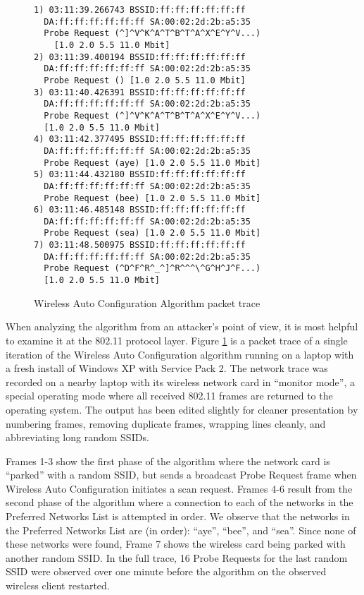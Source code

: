 \documentclass[10pt,twocolumn]{article}
\begin{document}

\begin{figure}
\begin{verbatim}
1) 03:11:39.266743 BSSID:ff:ff:ff:ff:ff:ff
  DA:ff:ff:ff:ff:ff:ff SA:00:02:2d:2b:a5:35
  Probe Request (^]^V^K^A^T^B^T^A^X^E^Y^V...)
    [1.0 2.0 5.5 11.0 Mbit]
2) 03:11:39.400194 BSSID:ff:ff:ff:ff:ff:ff
  DA:ff:ff:ff:ff:ff:ff SA:00:02:2d:2b:a5:35
  Probe Request () [1.0 2.0 5.5 11.0 Mbit]
3) 03:11:40.426391 BSSID:ff:ff:ff:ff:ff:ff
  DA:ff:ff:ff:ff:ff:ff SA:00:02:2d:2b:a5:35
  Probe Request (^]^V^K^A^T^B^T^A^X^E^Y^V...)
  [1.0 2.0 5.5 11.0 Mbit]
4) 03:11:42.377495 BSSID:ff:ff:ff:ff:ff:ff
  DA:ff:ff:ff:ff:ff:ff SA:00:02:2d:2b:a5:35
  Probe Request (aye) [1.0 2.0 5.5 11.0 Mbit]
5) 03:11:44.432180 BSSID:ff:ff:ff:ff:ff:ff
  DA:ff:ff:ff:ff:ff:ff SA:00:02:2d:2b:a5:35
  Probe Request (bee) [1.0 2.0 5.5 11.0 Mbit]
6) 03:11:46.485148 BSSID:ff:ff:ff:ff:ff:ff
  DA:ff:ff:ff:ff:ff:ff SA:00:02:2d:2b:a5:35
  Probe Request (sea) [1.0 2.0 5.5 11.0 Mbit]
7) 03:11:48.500975 BSSID:ff:ff:ff:ff:ff:ff
  DA:ff:ff:ff:ff:ff:ff SA:00:02:2d:2b:a5:35
  Probe Request (^D^F^R^_^]^R^^^\^G^H^J^F...)
  [1.0 2.0 5.5 11.0 Mbit]
\end{verbatim}
\caption{Wireless Auto Configuration Algorithm packet trace}
\label{wacpkts}
\end{figure}

When analyzing the algorithm from an attacker's point of view, it is
most helpful to examine it at the 802.11 protocol layer.  Figure
\ref{wacpkts} is a packet trace of a single iteration of the Wireless
Auto Configuration algorithm running on a laptop with a fresh install
of Windows XP with Service Pack 2.  The network trace was recorded on
a nearby laptop with its wireless network card in ``monitor mode'', a
special operating mode where all received 802.11 frames are returned
to the operating system.  The output has been edited slightly for
cleaner presentation by numbering frames, removing duplicate frames,
wrapping lines cleanly, and abbreviating long random SSIDs.

Frames 1-3 show the first phase of the algorithm where the network
card is ``parked'' with a random SSID, but sends a broadcast Probe
Request frame when Wireless Auto Configuration initiates a scan
request.  Frames 4-6 result from the second phase of the algorithm
where a connection to each of the networks in the Preferred Networks
List is attempted in order.  We observe that the networks in the
Preferred Networks List are (in order): ``aye'', ``bee'', and
``sea''.  Since none of these networks were found, Frame 7 shows the
wireless card being parked with another random SSID.  In the full
trace, 16 Probe Requests for the last random SSID were observed over
one minute before the algorithm on the observed wireless client
restarted.
\end{document}
